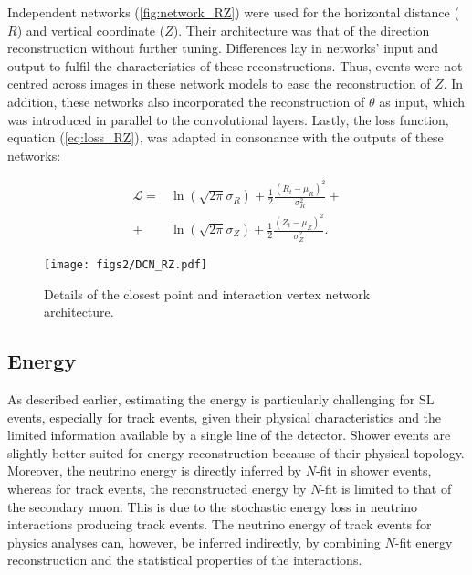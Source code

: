 Independent networks (\autoref{fig:network_RZ}) were used for the horizontal distance ($R$) and vertical coordinate ($Z$). Their architecture was that of the direction reconstruction without further tuning. Differences lay in networks' input and output to fulfil the characteristics of these reconstructions. Thus, events were not centred across images in these network models to ease the reconstruction of $Z$. In addition, these networks also incorporated the reconstruction of $\theta$ as input, which was introduced in parallel to the convolutional layers. Lastly, the loss function, equation (\ref{eq:loss_RZ}), was adapted in consonance with the outputs of these networks: 

\begin{equation}
	\label{eq:loss_RZ}
	\begin{split}
		\mathcal{L} = &\ln (\sqrt{2\pi}\sigma_{R}) + \frac{1}{2}\frac{(R_{t}-\mu_{R} )^2}{\sigma_{R}^2}+\\
		+ &\ln (\sqrt{2\pi}\sigma_{Z}) + \frac{1}{2}\frac{(Z_{t}-\mu_{Z} )^2}{\sigma_{Z}^2}.
	\end{split}
\end{equation}

\begin{figure}[htbp]
	\centering
	\texttt{[image: figs2/DCN\_RZ.pdf]}
	\caption{\label{fig:network_RZ}Details of the closest point and interaction vertex network architecture.}
\end{figure}


\subsection{Energy}
\label{subsec:energy}

As described earlier, estimating the energy is particularly challenging for SL events, especially for track events, given their physical characteristics and the limited information available by a single line of the detector. Shower events are slightly better suited for energy reconstruction because of their physical topology. Moreover, the neutrino energy is directly inferred by $N$-fit in shower events, whereas for track events, the reconstructed energy by $N$-fit is limited to that of the secondary muon. This is due to the stochastic energy loss in neutrino interactions producing track events. The neutrino energy of track events for physics analyses can, however, be inferred indirectly, by combining $N$-fit energy reconstruction and the statistical properties of the interactions.


